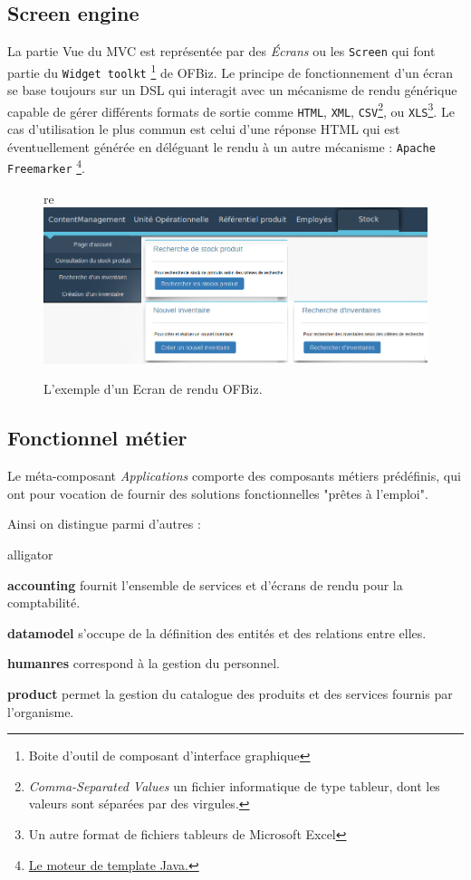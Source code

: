 \subsection{Screen engine}
La partie Vue du MVC est représentée par des \emph{Écrans} ou les \verb|Screen| qui font partie du \verb|Widget toolkt| \footnote{Boite d'outil de composant d'interface graphique} de OFBiz. Le principe de fonctionnement d'un écran se base toujours sur un DSL qui interagit avec un mécanisme de rendu générique capable de gérer différents formats de sortie comme \verb|HTML|, \verb|XML|, \verb|CSV|\footnote{\emph{Comma-Separated Values}  un fichier informatique de type tableur, dont les valeurs sont séparées par des virgules. }, ou \verb|XLS|\footnote{ Un autre format de fichiers tableurs de Microsoft Excel}. Le cas d'utilisation le plus commun est celui d'une réponse HTML qui est éventuellement générée en déléguant le rendu à un autre mécanisme : \verb|Apache Freemarker| \footnote{\href{https://freemarker.apache.org/}{Le moteur de template Java.}}.
\begin{figure}[h!]
re	\includegraphics[width=\linewidth]{screenOfbiZ.png}
	\caption{L'exemple d'un Ecran de rendu OFBiz.}
	\label{fig:screen}
\end{figure}

\subsection{Fonctionnel métier}
Le méta-composant \emph{Applications} comporte des composants métiers prédéfinis, qui ont pour vocation de fournir des solutions fonctionnelles "prêtes à l'emploi". 

Ainsi on distingue parmi d'autres :
\begin{labeling}{alligator}
	\item [\textbf{accounting}] fournit l'ensemble de services et d'écrans de rendu pour la comptabilité.
	\item [\textbf{datamodel}] s'occupe de la définition des entités et des relations entre elles.
	\item [\textbf{humanres}] correspond à la gestion du personnel.
	\item [\textbf{product}] permet la gestion du catalogue des produits et des services fournis par l'organisme.
\end{labeling}


